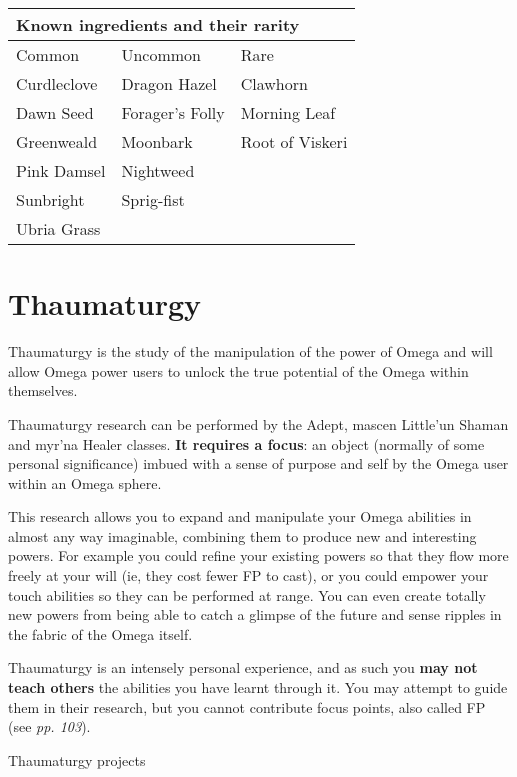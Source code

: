 \begin{table}
\begin{tabular}{|l|l|l|} \hline 
\multicolumn{3}{|l|}{Known ingredients and their rarity} \\
 \hline Common & Uncommon & Rare \\
 \hline Curdleclove & Dragon Hazel & Clawhorn \\
 \hline Dawn Seed & Forager's Folly & Morning Leaf \\
 \hline Greenweald & Moonbark & Root of Viskeri \\
 \hline Pink Damsel & Nightweed &  \\
 \hline Sunbright & Sprig-fist &  \\
 \hline Ubria Grass &  &  \\
 \hline \end{tabular}

\end{table}

\chapter{Thaumaturgy}

Thaumaturgy is the study of the manipulation of the power of Omega and will allow Omega power users to unlock the true potential of the Omega within themselves.

Thaumaturgy research can be performed by the Adept, mascen Little'un Shaman and myr'na Healer classes. \textbf{It requires a focus}: an object (normally of some personal significance) imbued with a sense of purpose and self by the Omega user within an Omega sphere.

This research allows you to expand and manipulate your Omega abilities in almost any way imaginable, combining them to produce new and interesting powers. For example you could refine your existing powers so that they flow more freely at your will (ie, they cost fewer FP to cast), or you could empower your touch abilities so they can be performed at range. You can even create totally new powers from being able to catch a glimpse of the future and sense ripples in the fabric of the Omega itself.

Thaumaturgy is an intensely personal experience, and as such you \textbf{may not teach others} the abilities you have learnt through it. You may attempt to guide them in their research, but you cannot contribute focus points, also called FP (see \textit{pp. 103}).

Thaumaturgy projects


